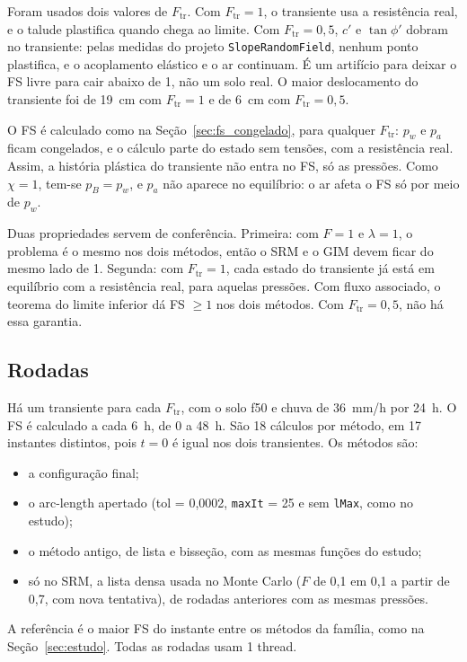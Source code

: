 \documentclass[11pt,a4paper]{article}
\numberwithin{equation}{section}
\begin{document}
Foram usados dois valores de $F_{\mathrm{tr}}$. Com $F_{\mathrm{tr}} = 1$, o transiente usa a resistência real, e o talude plastifica quando chega ao limite. Com $F_{\mathrm{tr}} = 0{,}5$, $c'$ e $\tan\phi'$ dobram no transiente: pelas medidas do projeto \texttt{SlopeRandomField}, nenhum ponto plastifica, e o acoplamento elástico e o ar continuam. É um artifício para deixar o FS livre para cair abaixo de 1, não um solo real. O maior deslocamento do transiente foi de 19~cm com $F_{\mathrm{tr}} = 1$ e de 6~cm com $F_{\mathrm{tr}} = 0{,}5$.

O FS é calculado como na Seção~\ref{sec:fs_congelado}, para qualquer $F_{\mathrm{tr}}$: $p_w$ e $p_a$ ficam congelados, e o cálculo parte do estado sem tensões, com a resistência real. Assim, a história plástica do transiente não entra no FS, só as pressões. Como $\chi = 1$, tem-se $p_B = p_w$, e $p_a$ não aparece no equilíbrio: o ar afeta o FS só por meio de $p_w$.

Duas propriedades servem de conferência. Primeira: com $F = 1$ e $\lambda = 1$, o problema é o mesmo nos dois métodos, então o SRM e o GIM devem ficar do mesmo lado de 1. Segunda: com $F_{\mathrm{tr}} = 1$, cada estado do transiente já está em equilíbrio com a resistência real, para aquelas pressões. Com fluxo associado, o teorema do limite inferior dá FS $\ge 1$ nos dois métodos. Com $F_{\mathrm{tr}} = 0{,}5$, não há essa garantia.

\subsection{Rodadas}

Há um transiente para cada $F_{\mathrm{tr}}$, com o solo f50 e chuva de 36~mm/h por 24~h. O FS é calculado a cada 6~h, de 0 a 48~h. São 18 cálculos por método, em 17 instantes distintos, pois $t = 0$ é igual nos dois transientes. Os métodos são:
\begin{itemize}
\item a configuração final;
\item o arc-length apertado (tol = 0,0002, \texttt{maxIt} = 25 e sem \texttt{lMax}, como no estudo);
\item o método antigo, de lista e bisseção, com as mesmas funções do estudo;
\item só no SRM, a lista densa usada no Monte Carlo ($F$ de 0,1 em 0,1 a partir de 0,7, com nova tentativa), de rodadas anteriores com as mesmas pressões.
\end{itemize}
A referência é o maior FS do instante entre os métodos da família, como na Seção~\ref{sec:estudo}. Todas as rodadas usam 1 thread.
\end{document}
